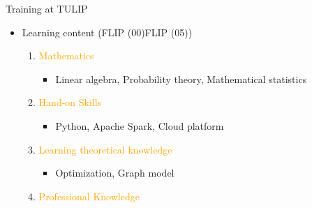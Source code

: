 \documentclass[
 size=14pt,
 paper=smartboard,  %
 mode=present, 		%
 display=slides, 	%
 style=tuliplab,  	%
 pauseslide,
 fleqn,leqno]{powerdot}
\begin{document}
\begin{slide}[toc=,bm=]{Training at TULIP}
    \begin{itemize}
      \item Learning content (FLIP (00)\texttildelow FLIP (05))
        \begin{enumerate}
          \item \textcolor{orange}{Mathematics}
            \begin{itemize}
              \item Linear algebra,
                    Probability theory,
                    Mathematical statistics
            \end{itemize}
          \item \textcolor{orange}{Hand-on Skills}
            \begin{itemize}
              \item Python,
                    Apache Spark,
                    Cloud platform
            \end{itemize}
          \item \textcolor{orange}{Learning theoretical knowledge}
            \begin{itemize}
              \item Optimization,
                    Graph model
            \end{itemize}
          \item \textcolor{orange}{Professional Knowledge}
        \end{enumerate}
    \end{itemize}
\end{slide}
\end{document}
